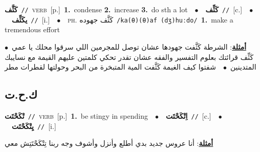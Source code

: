 \documentclass[10pt,a4paper,twoside]{article} %
\begin{document}
\begin{multicols}{2}
{\setlength\topsep{0pt}\textbf{\foreignlanguage{arabic}{كَثَّف}}\ {\color{gray}\texttt{//}\color{black}}\ \textsc{verb}\ [p.]\ \textbf{1.}~condense  \textbf{2.}~increase  \textbf{3.}~do sth a lot\ \ $\bullet$\ \ \setlength\topsep{0pt}\textbf{\foreignlanguage{arabic}{كَثِّف}}\ {\color{gray}\texttt{//}\color{black}}\ [c.]\ \ $\bullet$\ \ \setlength\topsep{0pt}\textbf{\foreignlanguage{arabic}{يكَثِّف}}\ {\color{gray}\texttt{//}\color{black}}\ [i.]\ \ $\bullet$\ \ \textsc{ph.} \color{gray} \foreignlanguage{arabic}{كَثَّف جهوده}\color{black}\ {\color{gray}\texttt{/{\sffamily ka(θ)(θ)af (dʒ)huːdo}/}\color{black}}\ \textbf{1.}~make a tremendous effort\  \begin{flushright}\color{gray}\foreignlanguage{arabic}{\textbf{\underline{\foreignlanguage{arabic}{أمثلة}}}: الشرطة كَثَّفت جهودها عشان توصل للمجرمين اللي سرقوا محلك يا عمي\ $\bullet$\ \  كَثِّف قرائتك بعلوم التفسير والفقه عشان تقدر تحكي كلمتين عليهم القيمة مع نسايبك المتدينين\ $\bullet$\ \  شفتوا كيف الغيمة كَثَّفت المية المتبخرة من البحر وحولتها لقطرات مطر}\end{flushright}\color{black}} \vspace{2mm}

\vspace{-3mm}
\subsection*{\color{blue}\foreignlanguage{arabic}{ك.ح.ت}\color{blue}{}} 

{\setlength\topsep{0pt}\textbf{\foreignlanguage{arabic}{تْكَحْتَت}}\ {\color{gray}\texttt{//}\color{black}}\ \textsc{verb}\ [p.]\ \textbf{1.}~be stingy in spending\ \ $\bullet$\ \ \setlength\topsep{0pt}\textbf{\foreignlanguage{arabic}{اِتْكَحْتَت}}\ {\color{gray}\texttt{//}\color{black}}\ [c.]\ \ $\bullet$\ \ \setlength\topsep{0pt}\textbf{\foreignlanguage{arabic}{يِتْكَحْتَت}}\ {\color{gray}\texttt{//}\color{black}}\ [i.]\  \begin{flushright}\color{gray}\foreignlanguage{arabic}{\textbf{\underline{\foreignlanguage{arabic}{أمثلة}}}: أنا عروس جديد بدي أطلع وأنزل وأشوف وجه ربنا تِتْكَحْتَتِش معي}\end{flushright}\color{black}} \vspace{2mm}


\end{multicols}
\end{document}
